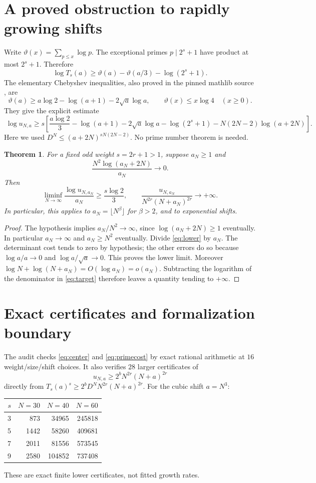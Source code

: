 \documentclass[11pt]{article}
\newtheorem{theorem}{Theorem}
\begin{document}
\section{A proved obstruction to rapidly growing shifts}
Write $\vartheta(x)=\sum_{p\le x}\log p$. The exceptional primes
$p\mid2^s+1$ have product at most $2^s+1$. Therefore
\[
 \log T_s(a)\ge\vartheta(a)-\vartheta(a/3)-\log(2^s+1).
\]
The elementary Chebyshev inequalities, also proved in the pinned
mathlib source \cite{Chebyshev}, are
\[
 \vartheta(a)\ge a\log2-\log(a+1)-2\sqrt a\log a,\qquad
 \vartheta(x)\le x\log4\quad(x\ge0).
\]
They give the explicit estimate
\begin{equation}
 \boxed{\;
 \log u_{N,a}\ge s\left[
 \frac{a\log2}{3}-\log(a+1)-2\sqrt a\log a-\log(2^s+1)
 -N(2N-2)\log(a+2N)\right].
 \;}
 \label{eq:lower}
\end{equation}
Here we used $D^N\le(a+2N)^{sN(2N-2)}$.
No prime number theorem is needed.

\begin{theorem}
For a fixed odd weight $s=2r+1>1$, suppose $a_N\ge1$ and
\[
 \frac{N^2\log(a_N+2N)}{a_N}\longrightarrow0.
\]
Then
\[
 \liminf_{N\to\infty}\frac{\log u_{N,a_N}}{a_N}
 \ge\frac{s\log2}{3},\qquad
 \frac{u_{N,a_N}}{N^{2r}(N+a_N)^{2r}}\longrightarrow+\infty.
\]
In particular, this applies to $a_N=\lfloor N^\beta\rfloor$ for
$\beta>2$, and to exponential shifts.
\end{theorem}
\begin{proof}
The hypothesis implies $a_N/N^2\to\infty$, since
$\log(a_N+2N)\ge1$ eventually. In particular $a_N\to\infty$ and
$a_N\ge N^2$ eventually.
Divide \eqref{eq:lower} by $a_N$. The determinant cost tends to zero
by hypothesis; the other errors do so because
$\log a/a\to0$ and $\log a/\sqrt a\to0$.
This proves the lower limit.
Moreover $\log N+\log(N+a_N)=O(\log a_N)=o(a_N)$.
Subtracting the logarithm of the denominator in \eqref{eq:target}
therefore leaves a quantity tending to $+\infty$.
\end{proof}

\section{Exact certificates and formalization boundary}
The audit checks \eqref{eq:center} and \eqref{eq:primecost} by exact
rational arithmetic at $16$ weight/size/shift choices. It also verifies
$28$ larger certificates of
\[
 u_{N,a}\ge 2^b N^{2r}(N+a)^{2r}
\]
directly from $T_s(a)^s\ge2^bD^NN^{2r}(N+a)^{2r}$.
For the cubic shift $a=N^3$:
\begin{center}
\begin{tabular}{rrrr}
\toprule
$s$ & $N=30$ & $N=40$ & $N=60$\\
\midrule
3 & 873 & 34965 & 245818\\
5 & 1442 & 58260 & 409681\\
7 & 2011 & 81556 & 573545\\
9 & 2580 & 104852 & 737408\\
\bottomrule
\end{tabular}
\end{center}
These are exact finite lower certificates, not fitted growth rates.
\end{document}
